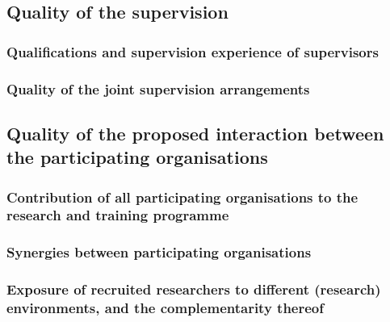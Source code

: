 \subsection{Quality of the supervision}

\subsubsection{Qualifications and supervision experience of supervisors}

\subsubsection{Quality of the joint supervision arrangements}


\subsection{Quality of the proposed interaction between the participating organisations}

\subsubsection{Contribution of all participating organisations to the research and training programme}

\subsubsection{Synergies between participating organisations}
\label{sec:synergies}


\subsubsection{Exposure of recruited researchers to different (research)
  environments, and the complementarity thereof}


